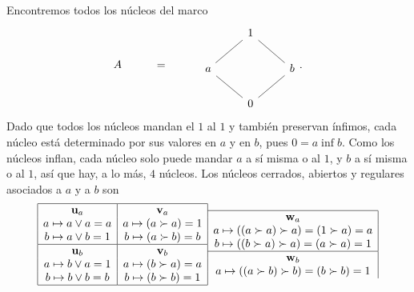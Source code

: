 \begin{example}%
  Encontremos todos los núcleos del marco
  \[
    A\hspace{10mm} = \hspace{10mm}
    \begin{tikzcd}
      & 1 \\
      a \ar[ur,no head] && b\ar[ul,no head] \\
      & 0 \ar[ur,no head] \ar[ul,no head]
    \end{tikzcd}
  .\]
  Dado que todos los núcleos mandan el $1$ al $1$ y
  también preservan ínfimos, cada núcleo está determinado por
  sus valores en $a$ y en $b$, pues $0=a\inf b$.
  Como los núcleos inflan, cada núcleo solo puede mandar $a$ a sí
  misma o al $1$, y $b$ a sí misma o al $1$, así que hay, a lo
  más, $4$ núcleos.
  Los núcleos cerrados, abiertos y regulares
  asociados a $a$ y a $b$ son
  \[ 
      \begin{array}{|c|}
          \hline
          \mathbf u_{a} \\
          a\mapsto a\vee a = a \\
          b\mapsto a\vee b = 1 \\ \hline
          \mathbf u_{b} \\
          a\mapsto b\vee a = 1 \\
          b\mapsto b\vee b = b \\
          \hline
      \end{array}
      \begin{array}{c|}
          \hline
          \mathbf v_{a} \\
          a\mapsto (a\succ a) = 1 \\
          b\mapsto (a\succ b) = b \\ \hline
          \mathbf v_{b} \\
          a\mapsto (b\succ a) = a \\
          b\mapsto (b\succ b) = 1 \\
          \hline
      \end{array}
      \begin{array}{c|}
          \hline
          \mathbf w_{a} \\
          a\mapsto ((a\succ a)\succ a) = (1\succ a) = a \\
          b\mapsto ((b\succ a)\succ a) = (a\succ a) = 1 \\
          \hline
          \mathbf w_{b} \\
          a\mapsto ((a\succ b)\succ b) = (b\succ b) = 1 \\

\end{array}\]
\end{example}
